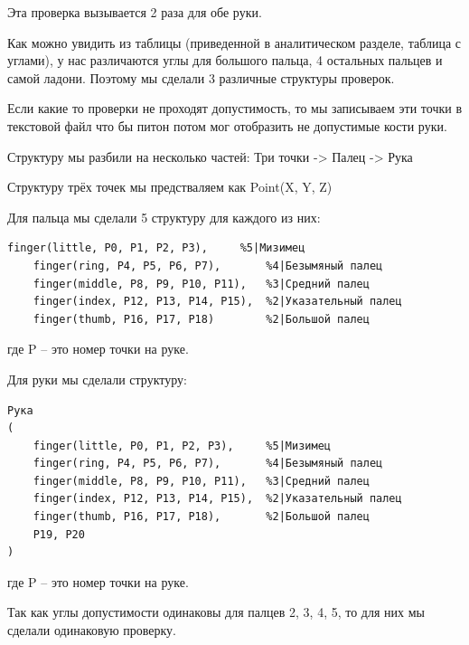 \hspace{0.6cm}Эта проверка вызывается 2 раза для обе руки.

\hspace{0.6cm} Как можно увидить из таблицы (приведенной в аналитическом разделе, таблица с углами), у нас различаются углы для большого пальца, 4 остальных пальцев и самой ладони. Поэтому мы сделали 3 различные структуры проверок.

\hspace{0.6cm} Если какие то проверки не проходят допустимость, то мы записываем эти точки в текстовой файл что бы питон потом мог отобразить не допустимые кости руки.

\hspace{0.6cm} Структуру мы разбили на несколько частей: 
\hspace{0.6cm} Три точки -> Палец -> Рука

\hspace{0.6cm} Структуру трёх точек мы предстваляем как Point(X, Y, Z)

\hspace{0.6cm} Для пальца мы сделали 5 структуру для каждого из них:
	
\begin{lstlisting}[caption=Листинг структур пальцев, label=struct:finger]
	finger(little, P0, P1, P2, P3),		%5|Мизимец
	finger(ring, P4, P5, P6, P7),		%4|Безымяный палец
	finger(middle, P8, P9, P10, P11),	%3|Средний палец
	finger(index, P12, P13, P14, P15),	%2|Указательный палец
	finger(thumb, P16, P17, P18)		%2|Большой палец
\end{lstlisting}
\hspace{0.6cm} где P – это номер точки на руке.

\hspace{0.6cm} Для руки мы сделали структуру:
\begin{lstlisting}[caption=Листинг структуры руки, label=struct:hand]
Рука
(
	finger(little, P0, P1, P2, P3),		%5|Мизимец
	finger(ring, P4, P5, P6, P7),		%4|Безымяный палец
	finger(middle, P8, P9, P10, P11),	%3|Средний палец
	finger(index, P12, P13, P14, P15),	%2|Указательный палец
	finger(thumb, P16, P17, P18),		%2|Большой палец
	P19, P20
)
\end{lstlisting}

\hspace{0.6cm} где P – это номер точки на руке.

\hspace{0.6cm} Так как углы допустимости одинаковы для палцев 2, 3, 4, 5, то для них мы сделали одинаковую проверку.

